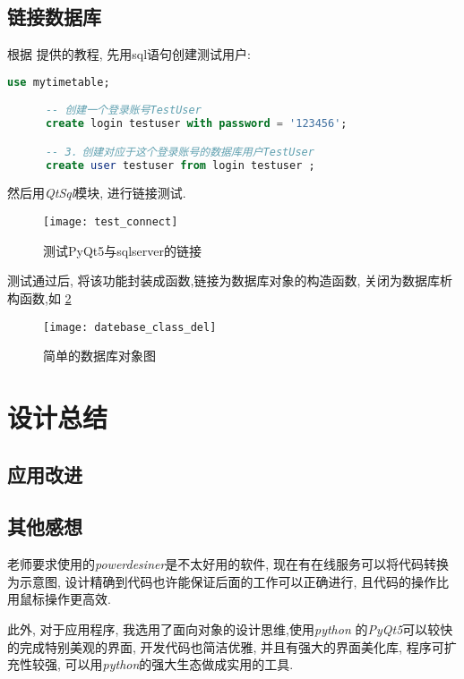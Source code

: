\documentclass{myreport}
\begin{document}
  \subsection{链接数据库}
    根据 \cite{connect_database} 提供的教程, 先用sql语句创建测试用户:
    \begin{lstlisting}[language=sql]
      use mytimetable;

      -- 创建一个登录账号TestUser
      create login testuser with password = '123456';

      -- 3．创建对应于这个登录账号的数据库用户TestUser
      create user testuser from login testuser ;
    \end{lstlisting}
    然后用\emph{QtSql}模块, 进行链接测试.
    \begin{figure}[H]
      \centering
      \texttt{[image: test\_connect]}
      \caption{测试PyQt5与sqlserver的链接}
      \label{fig:test_connect}
    \end{figure}

    测试通过后, 将该功能封装成函数,链接为数据库对象的构造函数,
    关闭为数据库析构函数,如
    \cref{fig:datebase_class_del}
    \begin{figure}[H]
      \centering
      \texttt{[image: datebase\_class\_del]}
      \caption{简单的数据库对象图}
      \label{fig:datebase_class_del}
    \end{figure}


\section{设计总结}
  \subsection{应用改进}

  \subsection{其他感想}
    老师要求使用的\emph{powerdesiner}是不太好用的软件,
    现在有在线服务可以将代码转换为示意图,
    设计精确到代码也许能保证后面的工作可以正确进行,
    且代码的操作比用鼠标操作更高效.

    此外, 对于应用程序, 我选用了面向对象的设计思维,使用\emph{python}
    的\emph{PyQt5}可以较快的完成特别美观的界面,
    开发代码也简洁优雅, 并且有强大的界面美化库,
    程序可扩充性较强, 可以用\emph{python}的强大生态做成实用的工具.



\nocite{silberschatz1997database} %

\nocite{drawio}
\nocite{pyqt5_beautify}
\nocite{icon}
\end{document}
